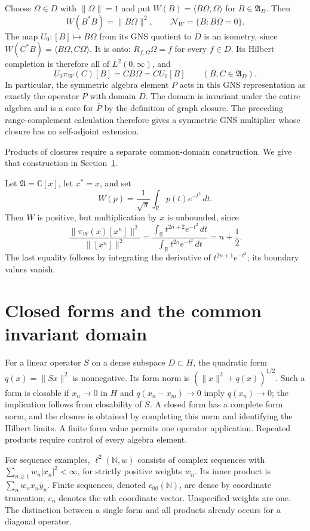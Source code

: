 \documentclass[11pt]{article}
\numberwithin{equation}{section}
\newcommand{\R}{\mathbb R}
\newcommand{\C}{\mathbb C}
\begin{document}
Choose $\Omega\in D$ with $\|\Omega\|=1$ and put
$W(B)=\langle B\Omega,\Omega\rangle$ for $B\in\mathfrak A_D$.
Then
\[
 W(B^*B)=\|B\Omega\|^2,\qquad
 \mathcal N_W=\{B:B\Omega=0\}.
\]
The map $U_0:[B]\mapsto B\Omega$ from its GNS quotient to $D$ is an
isometry, since
$W(C^*B)=\langle B\Omega,C\Omega\rangle$.
It is onto: $R_{f,\Omega}\Omega=f$ for every $f\in D$.
Its Hilbert completion is therefore all of $L^2(0,\infty)$, and
\[
 U_0\pi_W(C)[B]=CB\Omega=C U_0[B]
 \qquad(B,C\in\mathfrak A_D).
\]
In particular, the symmetric algebra element $P$ acts in this GNS
representation as exactly the operator $P$ with domain $D$.
The domain is invariant under the entire algebra and is a core for
$\overline P$ by the definition of graph closure.  The preceding
range-complement calculation therefore gives a symmetric GNS multiplier
whose closure has no self-adjoint extension.

Products of closures require a separate common-domain construction.
We give that construction in Section~\ref{sec:graph-domain}.

\begin{example}
Let $\mathfrak A=\C[x]$, let $x^*=x$, and set
\[
 W(p)=\frac1{\sqrt\pi}\int_{\R}p(t)e^{-t^2}\,dt.
\]
Then $W$ is positive, but multiplication by $x$ is unbounded, since
\[
 \frac{\|\pi_W(x)[x^n]\|^2}{\|[x^n]\|^2}
 =\frac{\int_{\R}t^{2n+2}e^{-t^2}\,dt}
        {\int_{\R}t^{2n}e^{-t^2}\,dt}
 =n+\frac12.
\]
The last equality follows by integrating the derivative of
$t^{2n+1}e^{-t^2}$; its boundary values vanish.
\end{example}

\section{Closed forms and the common invariant domain}
\label{sec:graph-domain}

For a linear operator $S$ on a dense subspace $D\subset H$, the quadratic
form $q(x)=\|Sx\|^2$ is nonnegative.  Its form norm is
$(\|x\|^2+q(x))^{1/2}$.  Such a form is closable if $x_n\to0$ in $H$ and
$q(x_n-x_m)\to0$ imply $q(x_n)\to0$; the implication follows from
closability of $S$.  A closed form has a complete form norm, and the closure
is obtained by completing this norm and identifying the Hilbert limits.
A finite form value permits one operator application.  Repeated products
require control of every algebra element.

For sequence examples, $\ell^2(\mathbb N,w)$ consists of complex sequences
with $\sum_{n\geq1}w_n|x_n|^2<\infty$, for strictly positive weights $w_n$.
Its inner product is $\sum_n w_nx_n\bar y_n$.  Finite sequences, denoted
$c_{00}(\mathbb N)$, are dense by coordinate truncation; $e_n$ denotes the
$n$th coordinate vector.  Unspecified weights are one.
The distinction between a single form and all products already occurs for
a diagonal operator.
\end{document}
